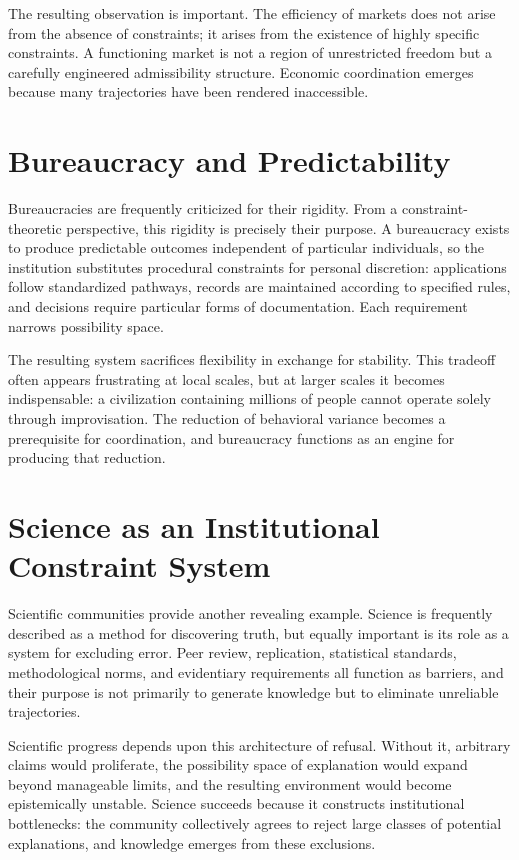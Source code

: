 \documentclass[11pt,oneside]{book}
\theoremstyle{plain}
\theoremstyle{definition}
\theoremstyle{remark}
\begin{document}
The resulting observation is important. The efficiency of markets does not arise from the absence of constraints; it arises from the existence of highly specific constraints. A functioning market is not a region of unrestricted freedom but a carefully engineered admissibility structure. Economic coordination emerges because many trajectories have been rendered inaccessible.

\section{Bureaucracy and Predictability}

Bureaucracies are frequently criticized for their rigidity. From a constraint-theoretic perspective, this rigidity is precisely their purpose. A bureaucracy exists to produce predictable outcomes independent of particular individuals, so the institution substitutes procedural constraints for personal discretion: applications follow standardized pathways, records are maintained according to specified rules, and decisions require particular forms of documentation. Each requirement narrows possibility space.

The resulting system sacrifices flexibility in exchange for stability. This tradeoff often appears frustrating at local scales, but at larger scales it becomes indispensable: a civilization containing millions of people cannot operate solely through improvisation. The reduction of behavioral variance becomes a prerequisite for coordination, and bureaucracy functions as an engine for producing that reduction.

\section{Science as an Institutional Constraint System}

Scientific communities provide another revealing example. Science is frequently described as a method for discovering truth, but equally important is its role as a system for excluding error. Peer review, replication, statistical standards, methodological norms, and evidentiary requirements all function as barriers, and their purpose is not primarily to generate knowledge but to eliminate unreliable trajectories.

Scientific progress depends upon this architecture of refusal. Without it, arbitrary claims would proliferate, the possibility space of explanation would expand beyond manageable limits, and the resulting environment would become epistemically unstable. Science succeeds because it constructs institutional bottlenecks: the community collectively agrees to reject large classes of potential explanations, and knowledge emerges from these exclusions.
\end{document}
